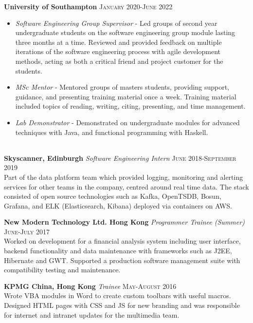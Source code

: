 \documentclass{article}
\begin{document}
\textbf{University of Southampton} \hfill \textsc{January 2020-June 2022}
\begin{itemize}
    \item \textit{Software Engineering Group Supervisor} - Led groups of
    second year undergraduate students on the software engineering group module lasting
    three months at a time. Reviewed and provided feedback on multiple iterations
    of the software engineering process with agile development methods, acting as
    both a critical friend and project customer for the students.
    \item \textit{MSc Mentor} - Mentored groups of masters students,
    providing support, guidance, and presenting training material once a week. Training material
    included topics of reading, writing, citing, presenting, and time management.
    \item \textit{Lab Demonstrator} - Demonstrated on undergraduate modules
    for advanced techniques with Java, and functional programming with Haskell.
\end{itemize}
\ \\
\textbf{Skyscanner, Edinburgh} \textit{Software Engineering Intern}
\hfill
\textsc{June 2018-September 2019} \\
Part of the data platform team which provided logging, monitoring and alerting services for
other teams in the company, centred around real time data. The stack consisted of open source
technologies such as Kafka, OpenTSDB, Bosun, Grafana, and ELK (Elasticsearch, Kibana)
deployed via containers on AWS.
\newline

\textbf{New Modern Technology Ltd. Hong Kong} \textit{Programmer Trainee (Summer)}
\hfill
\textsc{June-July 2017} \\
Worked on development for a financial analysis system including user interface,
backend functionality and data maintenance with frameworks such as J2EE, Hibernate and GWT.
Supported a production software management suite with compatibility testing and maintenance.
\newline

\textbf{KPMG China, Hong Kong} \textit{Trainee}
\hfill
\textsc{May-August 2016} \\
Wrote VBA modules in Word to create custom toolbars with useful macros.
Designed HTML pages with CSS and JS for new branding and was responsible for
internet and intranet updates for the multimedia team.
\newline
\end{document}
